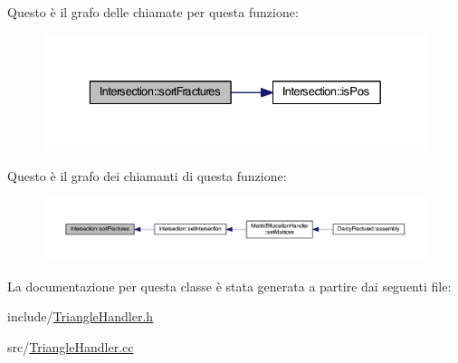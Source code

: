 Questo è il grafo delle chiamate per questa funzione\-:\nopagebreak
\begin{figure}[H]
\begin{center}
\leavevmode
\includegraphics[width=329pt]{classIntersection_ab3bd72c81dc261d3035213e5cefbb1c5_cgraph}
\end{center}
\end{figure}




Questo è il grafo dei chiamanti di questa funzione\-:\nopagebreak
\begin{figure}[H]
\begin{center}
\leavevmode
\includegraphics[width=350pt]{classIntersection_ab3bd72c81dc261d3035213e5cefbb1c5_icgraph}
\end{center}
\end{figure}




La documentazione per questa classe è stata generata a partire dai seguenti file\-:\begin{DoxyCompactItemize}
\item 
include/\hyperlink{TriangleHandler_8h}{Triangle\-Handler.\-h}\item 
src/\hyperlink{TriangleHandler_8cc}{Triangle\-Handler.\-cc}\end{DoxyCompactItemize}
